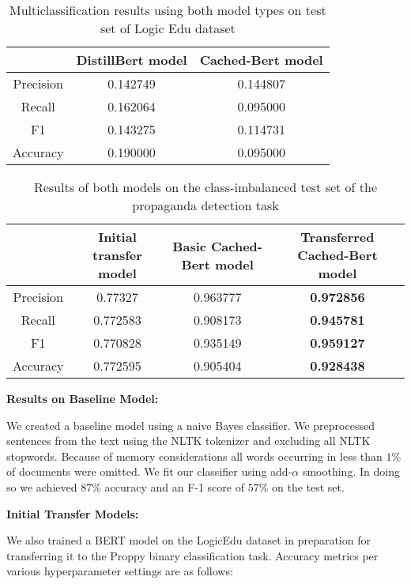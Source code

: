 \documentclass[conference]{IEEEtran}
\begin{document}
\begin{table}
\label{table:result1}
    \centering
    \begin{tabular}{c|c c}
 	& DistillBert model & Cached-Bert model\\\hline
Precision &	0.142749 & 0.144807 \\
Recall    & 0.162064 & 0.095000 \\
F1        &	0.143275 & 0.114731 \\
Accuracy  &	0.190000 & 0.095000
\end{tabular}
    \caption{Multiclassification results using both model types on test set of Logic Edu dataset}
    \label{tab:logic_outputs}
\end{table}


\begin{table*}
\label{table:resultproppy}
    \centering
    \begin{tabular}{c|c c c}
 	& Initial transfer model & Basic Cached-Bert model & Transferred Cached-Bert model \\\hline
Precision &	0.77327  & 0.963777 &   \textbf{0.972856}  \\
Recall    & 0.772583 & 0.908173 &   \textbf{0.945781}  \\
F1        &	0.770828 & 0.935149 &	 \textbf{0.959127} \\
Accuracy  &	0.772595 & 0.905404 &	 \textbf{0.928438}  
\end{tabular}
    \caption{Results of both models on the class-imbalanced test set of the propaganda detection task}
    \label{tab:prop_outputs}
\end{table*}
\textbf{Results on Baseline Model:} 

We created a baseline model using a naive Bayes classifier. We preprocessed sentences from the text using the NLTK tokenizer and excluding all NLTK stopwords. Because of memory considerations all words occurring in less than $1\%$ of documents were omitted. We fit our classifier using add-$\alpha$ smoothing. In doing so we achieved $87\%$ accuracy and an F-1 score of $57\%$ on the test set.  

\textbf{Initial Transfer Models:} 

We also trained a BERT model on the LogicEdu dataset in preparation for transferring it to the Proppy binary classification task. Accuracy metrics per various hyperparameter settings are as follows:
\end{document}
